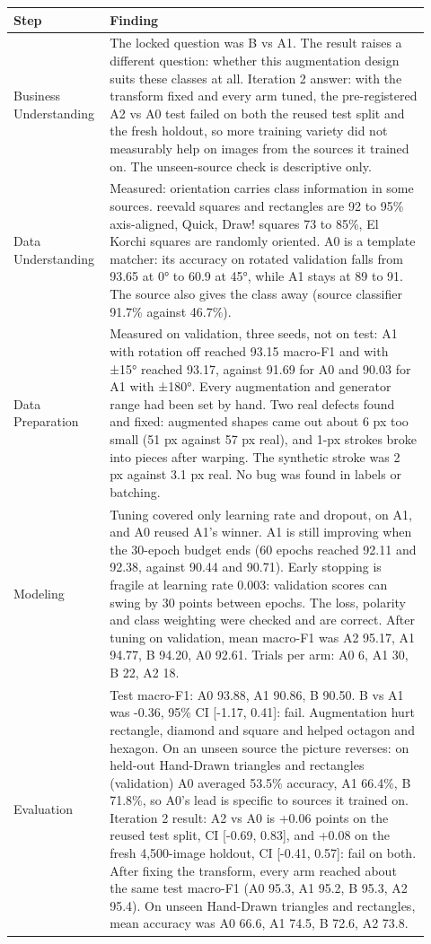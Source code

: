 \begin{tabular}{p{0.18\linewidth}p{0.74\linewidth}}
\toprule
Step & Finding \\
\midrule
Business Understanding & The locked question was B vs A1. The result raises a different question: whether this augmentation design suits these classes at all. Iteration 2 answer: with the transform fixed and every arm tuned, the pre-registered A2 vs A0 test failed on both the reused test split and the fresh holdout, so more training variety did not measurably help on images from the sources it trained on. The unseen-source check is descriptive only. \\
Data Understanding & Measured: orientation carries class information in some sources. reevald squares and rectangles are 92 to 95\% axis-aligned, Quick, Draw! squares 73 to 85\%, El Korchi squares are randomly oriented. A0 is a template matcher: its accuracy on rotated validation falls from 93.65 at 0° to 60.9 at 45°, while A1 stays at 89 to 91. The source also gives the class away (source classifier 91.7\% against 46.7\%). \\
Data Preparation & Measured on validation, three seeds, not on test: A1 with rotation off reached 93.15 macro-F1 and with ±15° reached 93.17, against 91.69 for A0 and 90.03 for A1 with ±180°. Every augmentation and generator range had been set by hand. Two real defects found and fixed: augmented shapes came out about 6 px too small (51 px against 57 px real), and 1-px strokes broke into pieces after warping. The synthetic stroke was 2 px against 3.1 px real. No bug was found in labels or batching. \\
Modeling & Tuning covered only learning rate and dropout, on A1, and A0 reused A1's winner. A1 is still improving when the 30-epoch budget ends (60 epochs reached 92.11 and 92.38, against 90.44 and 90.71). Early stopping is fragile at learning rate 0.003: validation scores can swing by 30 points between epochs. The loss, polarity and class weighting were checked and are correct. After tuning on validation, mean macro-F1 was A2 95.17, A1 94.77, B 94.20, A0 92.61. Trials per arm: A0 6, A1 30, B 22, A2 18. \\
Evaluation & Test macro-F1: A0 93.88, A1 90.86, B 90.50. B vs A1 was -0.36, 95\% CI [-1.17, 0.41]: fail. Augmentation hurt rectangle, diamond and square and helped octagon and hexagon. On an unseen source the picture reverses: on held-out Hand-Drawn triangles and rectangles (validation) A0 averaged 53.5\% accuracy, A1 66.4\%, B 71.8\%, so A0's lead is specific to sources it trained on. Iteration 2 result: A2 vs A0 is +0.06 points on the reused test split, CI [-0.69, 0.83], and +0.08 on the fresh 4,500-image holdout, CI [-0.41, 0.57]: fail on both. After fixing the transform, every arm reached about the same test macro-F1 (A0 95.3, A1 95.2, B 95.3, A2 95.4). On unseen Hand-Drawn triangles and rectangles, mean accuracy was A0 66.6, A1 74.5, B 72.6, A2 73.8. \\

\end{tabular}
